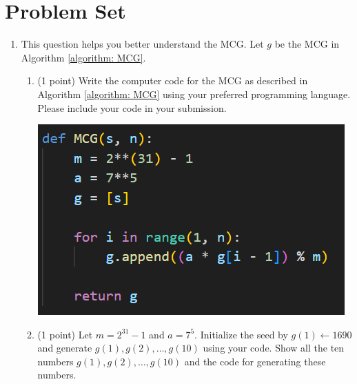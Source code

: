 \documentclass[11pt,letterpaper, leqno]{article}
\begin{document}
\newpage
\section{Problem Set}

\begin{enumerate}

\item This question helps you better understand the MCG. Let $g$ be the MCG in Algorithm \ref{algorithm: MCG}.
\begin{enumerate}
    \item (1 point) Write the computer code for the MCG as described in Algorithm \ref{algorithm: MCG} using your preferred programming language. Please include your code in your submission.
    
    \begin{center}
        \includegraphics{Images/1A.png}
    \end{center}

    \item (1 point) Let $m=2^{31}-1$ and $a=7^5$. Initialize the seed by $g(1) \leftarrow 1690$ and generate $g(1),g(2),\ldots, g(10)$ using your code. Show all the ten numbers $g(1), g(2),\ldots, g(10)$ and the code for generating these numbers.
    

\end{enumerate}
\end{enumerate}
\end{document}
